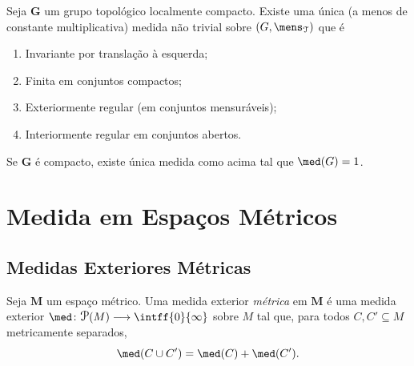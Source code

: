 \begin{prop}
Seja $\bm G$ um grupo topológico localmente compacto. Existe uma única (a menos de constante multiplicativa) medida não trivial sobre $(G,\mens_\topo)$ que é
	\begin{enumerate}
	\item Invariante por translação à esquerda;
	\item Finita em conjuntos compactos;
	\item Exteriormente regular (em conjuntos mensuráveis);
	\item Interiormente regular em conjuntos abertos.
	\end{enumerate}

Se $\bm G$ é compacto, existe única medida como acima tal que $\med(G)=1$.
\end{prop}




\section{Medida em Espaços Métricos}

\subsection{Medidas Exteriores Métricas}

\begin{defi}
Seja $\bm M$ um espaço métrico. Uma medida exterior \emph{métrica} em $\bm M$ é uma medida exterior $\med\colon \p(M) \to \intff{0}{\infty}$ sobre $M$ tal que, para todos $C,C' \subseteq M$ metricamente separados,
	\begin{equation*}
	\med(C \cup C') = \med(C) + \med(C').
	\end{equation*}
\end{defi}

